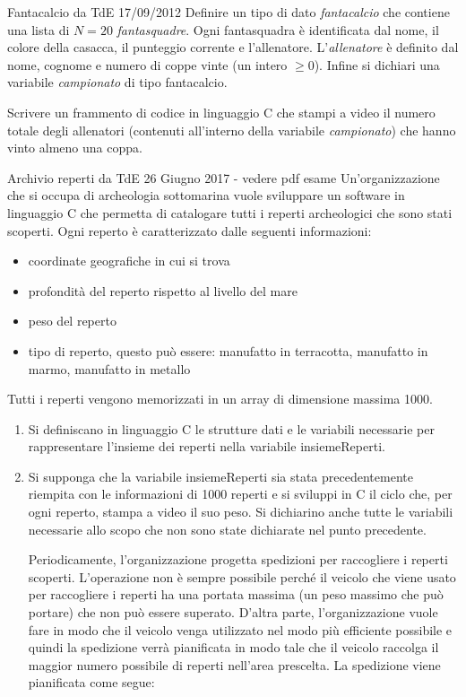 \documentclass[format=169]{beamer}
\begin{document}
\begin{frame}{Fantacalcio da TdE 17/09/2012}
Definire un tipo di dato \emph{fantacalcio} che contiene una lista di $N = 20$ \emph{fantasquadre}. Ogni fantasquadra è identificata dal nome, il colore della casacca, il punteggio corrente e l’allenatore. L’\emph{allenatore} è definito dal nome, cognome e numero di coppe vinte (un intero $\geq 0$). Infine si dichiari una variabile \emph{campionato} di
tipo fantacalcio. 

Scrivere un frammento di codice in linguaggio C che stampi a video il numero totale degli allenatori (contenuti all'interno della variabile \emph{campionato}) che hanno vinto almeno una coppa.
\end{frame}



\begin{frame}[allowframebreaks]{Archivio reperti da TdE 26 Giugno 2017 - vedere pdf esame}
Un’organizzazione che si occupa di archeologia sottomarina vuole sviluppare un software in linguaggio C
che permetta di catalogare tutti i reperti archeologici che sono stati scoperti. Ogni reperto è caratterizzato
dalle seguenti informazioni:
\begin{itemize}
\item coordinate geografiche in cui si trova
\item profondità del reperto rispetto al livello del mare
\item  peso del reperto
\item  tipo di reperto, questo può essere: manufatto in terracotta, manufatto in marmo, manufatto in metallo
\end{itemize}
Tutti i reperti vengono memorizzati in un array di dimensione massima 1000.

\begin{enumerate}
\item Si definiscano in linguaggio C le strutture dati e le variabili necessarie per rappresentare l’insieme dei
reperti nella variabile insiemeReperti.
\item  Si supponga che la variabile insiemeReperti sia stata precedentemente riempita con le informazioni
di 1000 reperti e si sviluppi in C il ciclo che, per ogni reperto, stampa a video il suo peso. Si dichiarino
anche tutte le variabili necessarie allo scopo che non sono state dichiarate nel punto precedente.

Periodicamente, l’organizzazione progetta spedizioni per raccogliere i reperti scoperti. L’operazione non è
sempre possibile perché il veicolo che viene usato per raccogliere i reperti ha una portata massima (un peso
massimo che può portare) che non può essere superato. D’altra parte, l’organizzazione vuole fare in modo
che il veicolo venga utilizzato nel modo più efficiente possibile e quindi la spedizione verrà pianificata in
modo tale che il veicolo raccolga il maggior numero possibile di reperti nell’area prescelta. La spedizione
viene pianificata come segue:


\end{enumerate}
\end{frame}
\end{document}
